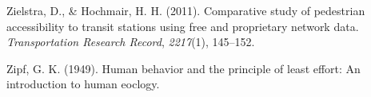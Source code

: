 \documentclass[
11pt, %
oneside, %
english, %
singlespacing, %
]{macthesis} %
\newlength{\cslhangindent}
\newenvironment{CSLReferences}[2] %
 {%
  \setlength{\parindent}{0pt}
  \ifodd #1 \everypar{\setlength{\hangindent}{\cslhangindent}}\ignorespaces\fi
  \ifnum #2 > 0
  \setlength{\parskip}{#2\baselineskip}
  \fi
 }%
 {}
\begin{document}
\begin{CSLReferences}{1}{0}
\leavevmode{}%
Zielstra, D., \& Hochmair, H. H. (2011). Comparative study of pedestrian accessibility to transit stations using free and proprietary network data. \emph{Transportation Research Record}, \emph{2217}(1), 145--152.

\leavevmode{}%
Zipf, G. K. (1949). Human behavior and the principle of least effort: An introduction to human eoclogy.

\end{CSLReferences}
\end{document}

